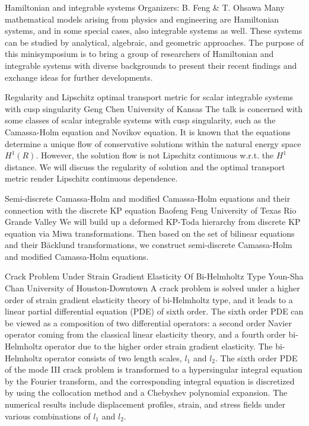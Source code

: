 \label{mini11}

\miniabs
{Hamiltonian and integrable systems}
{Organizers: B. Feng \& T. Ohsawa}
{Many mathematical models arising from physics and engineering are Hamiltonian systems, and in some special cases, also integrable systems as well. These systems can be studied by analytical, algebraic, and geometric approaches. The purpose of this minisymposium is to bring a group of researchers of Hamiltonian and integrable systems with diverse backgrounds to present their recent findings and exchange ideas for further developments.}

\vspace{2ex}
\abs
{Regularity and Lipschitz optimal transport metric for scalar integrable systems with cusp singularity}
{Geng Chen}
{University of Kansas}
{The talk is concerned with some classes of scalar integrable systems with cusp singularity, such as the Camassa-Holm equation and Novikov equation. It is known that the equations determine a unique flow of conservative solutions within the natural energy space $H^1(R)$. However, the solution flow is not Lipschitz continuous w.r.t. the $H^1$ distance. We will discuss the regularity of solution and the optimal transport metric render Lipschitz continuous dependence.}


\vspace{1.5ex}
\abs
{Semi-discrete Camassa-Holm and modified Camassa-Holm equations and their connection with the discrete KP equation}
{Baofeng Feng}
{University of Texas Rio Grande Valley}
{We will build up a deformed KP-Toda hierarchy from discrete KP equation via Miwa transformations. Then based on the set of bilinear equations and their B{\"a}cklund transformations, we construct semi-discrete Camassa-Holm and modified Camassa-Holm equations.}


\vspace{1.5ex}
\abs
{Crack Problem Under Strain Gradient Elasticity Of Bi-Helmholtz Type}
{Youn-Sha Chan}
{University of Houston-Downtown}
{A crack problem is solved under a higher order of strain gradient elasticity theory of bi-Helmholtz type, and it leads to a linear partial differential equation (PDE) of sixth order. The sixth order PDE can be viewed as a composition of two differential operators: a second order Navier operator coming from the classical linear elasticity theory, and a fourth order bi-Helmholtz operator due to the higher order strain gradient elasticity. The bi-Helmholtz operator consists of two length scales, $l_1$ and $l_2$. The sixth order PDE of the mode III crack problem is transformed to a hypersingular integral equation by the Fourier transform, and the corresponding integral equation is discretized by using the collocation method and a Chebyshev polynomial expansion. The numerical results include displacement profiles, strain, and stress fields under various combinations of $l_1$ and $l_2$.
}

